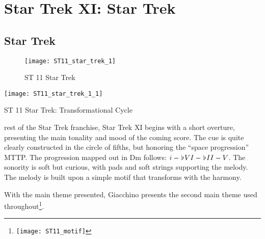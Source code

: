 
\chapter{Star Trek XI: Star Trek}\label{ch:st 11}

\section{Star Trek}

\begin{figure}[h!]
\center
\texttt{[image: ST11\_star\_trek\_1]}
	\caption{ST 11 Star Trek}
	\label{ST11_star_trek_1}
\end{figure}

\begin{marginfigure}
\texttt{[image: ST11\_star\_trek\_1\_1]}
	\caption{ST 11 Star Trek: Transformational Cycle}
	\label{ST11_star_trek_1_1}
\end{marginfigure}

\noindent{} rest of the Star Trek franchise, Star Trek XI begins with a short overture, presenting the main tonality and mood of the coming score. The cue is quite clearly constructed in the circle of fifths, but honoring the ``space progression'' \ac{MTTP}. The progression mapped out in Dm follows: \(i-\hspace*{0.18ex}\flat\hspace*{0.18ex}{VI}-\hspace*{0.18ex}\flat\hspace*{0.18ex}{II}-V\). The sonority is soft but curious, with pads and soft strings supporting the melody. The melody is built upon a simple motif that transforms with the harmony.

With the main theme presented, Giacchino presents the second main theme used throughout\footnote{\texttt{[image: ST11\_motif]}}. 
\clearpage


